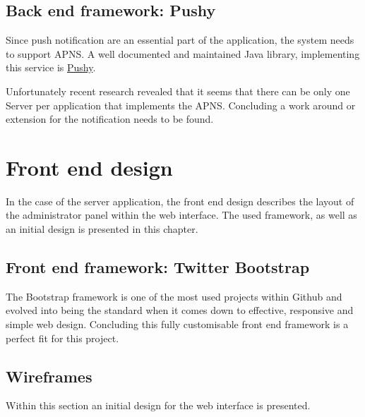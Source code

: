 \section{Back end framework: Pushy}
Since push notification are an essential part of the application, the system needs to support \acrfull{APNS}. A well documented and maintained Java library, implementing this service is \href{http://relayrides.github.io/pushy/}{Pushy}. 

Unfortunately recent research revealed that it seems that there can be only one Server per application that implements the \acrshort{APNS}. Concluding a work around or extension for the notification needs to be found. 

\chapter{Front end design}
In the case of the server application, the front end design describes the layout of the administrator panel within the web interface. The used framework, as well as an initial design is presented in this chapter.

\section{Front end framework: Twitter Bootstrap}
The Bootstrap framework is one of the most used projects within Github and evolved into being the standard when it comes down to effective, responsive and simple web design. Concluding this fully customisable front end framework is a perfect fit for this project.

\section{Wireframes}
Within this section an initial design for the web interface is presented.
